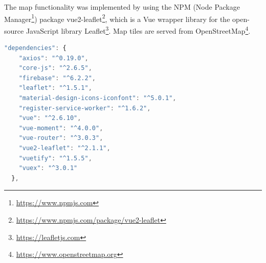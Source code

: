 The map functionality was implemented by using the NPM (Node Package Manager\footnote{\url{https://www.npmjs.com}}) package vue2-leaflet\footnote{\url{https://www.npmjs.com/package/vue2-leaflet}}, which is a Vue wrapper library for the open-source JavaScript library Leaflet\footnote{\url{https://leafletjs.com}}. Map tiles are served from OpenStreetMap\footnote{\url{https://www.openstreetmap.org}}.

\begin{lstlisting}[language=JavaScript, caption=All final npm dependencies in packages.json, label=lst:packages]
"dependencies": {
    "axios": "^0.19.0",
    "core-js": "^2.6.5",
    "firebase": "^6.2.2",
    "leaflet": "^1.5.1",
    "material-design-icons-iconfont": "^5.0.1",
    "register-service-worker": "^1.6.2",
    "vue": "^2.6.10",
    "vue-moment": "^4.0.0",
    "vue-router": "^3.0.3",
    "vue2-leaflet": "^2.1.1",
    "vuetify": "^1.5.5",
    "vuex": "^3.0.1"
  },
\end{lstlisting}

